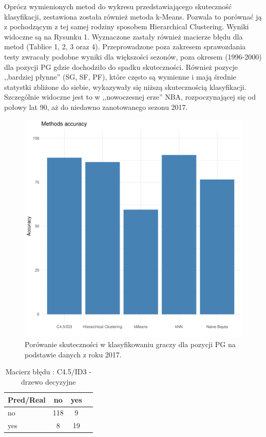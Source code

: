 \documentclass[twoside,twocolumn]{article}
\begin{document}
Oprócz wymienionych metod do wykresu przedstawiającego skuteczność klasyfikacji, zestawiona została również metoda k-Means. Pozwala to porównać ją z pochodzącym z tej samej rodziny sposobem Hierarchical Clustering. Wyniki widoczne są na Rysunku 1. Wyznaczone zastały również macierze błędu dla metod (Tablice 1, 2, 3 oraz 4). Przeprowadzone poza zakresem sprawozdania testy zwracały podobne wyniki dla większości sezonów, poza okresem (1996-2000) dla pozycji PG gdzie dochodziło do spadku skuteczności. Również pozycje ,,bardziej płynne'' (SG, SF, PF), które często są wymienne i mają średnie statystki zbliżone do siebie, wykazywały się niższą skutecznością klasyfikacji. Szczególnie widoczne jest to w ,,nowoczesnej erze'' NBA, rozpoczynającej się od połowy lat 90, aż do niedawno zanotowanego sezonu 2017.
\begin{figure}[hbt!]
  \centering
    \includegraphics[width=\linewidth]{plot_acc.pdf}
  \caption{Porówanie skuteczności w klasyfikowaniu graczy dla pozycji PG na podstawie danych z roku 2017.}
  \label{fig:coffee}
\end{figure}

\begin{table}[hbt!]
\centering
\caption{Macierz błędu : C4.5/ID3 - drzewo decyzyjne}
\begin{tabular}{l*{2}{c}r}
Pred/Real & no & yes \\
\hline
no & 118 & 9 \\
yes & 8 & 19 \\
\end{tabular}
\end{table}
\end{document}
